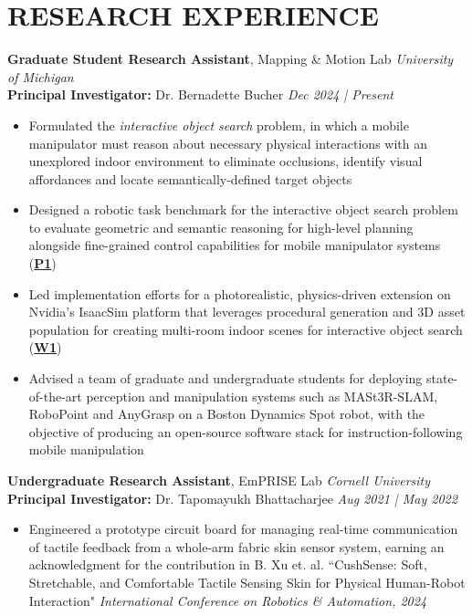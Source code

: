 \documentclass[a4paper,9pt]{extarticle}
\begin{document}
\section*{RESEARCH EXPERIENCE}
\noindent
\textbf{Graduate Student Research Assistant}, Mapping \& Motion Lab \hfill \textit{University of Michigan} \\ %
\textbf{Principal Investigator:} Dr. Bernadette Bucher \hfill \textit{Dec 2024 | Present} %
\begin{itemize}
    \item Formulated the \textit{interactive object search} problem, in which a mobile manipulator must reason about necessary physical interactions with an unexplored indoor environment to eliminate occlusions, identify visual affordances and locate semantically-defined target objects
    \item Designed a robotic task benchmark for the interactive object search problem to evaluate geometric and semantic reasoning for high-level planning alongside fine-grained control capabilities for mobile manipulator systems (\hyperlink{forage}{\textbf{P1}})
    \item Led implementation efforts for a photorealistic, physics-driven extension on Nvidia's IsaacSim platform that leverages procedural generation and 3D asset population for creating multi-room indoor scenes for interactive object search (\hyperlink{phygs}{\textbf{W1}})
    \item Advised a team of graduate and undergraduate students for deploying state-of-the-art perception and manipulation systems such as MASt3R-SLAM, RoboPoint and AnyGrasp on a Boston Dynamics Spot robot, with the objective of producing an open-source software stack for instruction-following mobile manipulation
\end{itemize}

\noindent
\textbf{Undergraduate Research Assistant}, EmPRISE Lab \hfill \textit{Cornell University} \\ %
\textbf{Principal Investigator:} Dr. Tapomayukh Bhattacharjee \hfill \textit{Aug 2021 | May 2022} %
\begin{itemize}
    \item Engineered a prototype circuit board for managing real-time communication of tactile feedback from a whole-arm fabric skin sensor system, earning an acknowledgment for the contribution in B. Xu et. al. ``CushSense: Soft, Stretchable, and Comfortable Tactile Sensing Skin for Physical Human-Robot Interaction" \textit{International Conference on Robotics \& Automation, 2024} 
\end{itemize}
\end{document}
